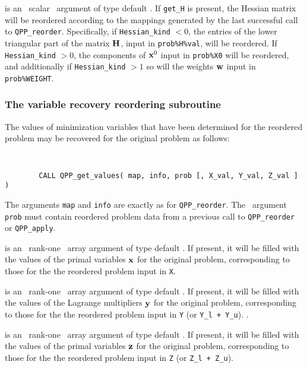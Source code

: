 \documentclass{galahad}
\newcommand{\packagename}{QPP}
\begin{document}
\begin{description}
is an \optional\ scalar \intentin\ argument of type default \logical. 
If {\tt get\_H} is present, the Hessian matrix will be reordered according to the
mappings generated by the last successful call to {\tt \packagename\_reorder}. 
Specifically, if {\tt Hessian\_kind} $< 0$, the entries of the 
lower triangular part of the matrix ${\mathbf{H}}$, input in {\tt prob\%H\%val}, 
will be reordered. If {\tt Hessian\_kind} $> 0$, the 
components of ${\mathbf{x}}^0$ input in {\tt prob\%X0} will be reordered, 
and additionally if {\tt Hessian\_kind} $> 1$ so will the weights 
${\mathbf{w}}$ input in {\tt prob\%WEIGHT}.

\end{description}


\subsubsection{The  variable recovery reordering subroutine}
The values of minimization variables that have been determined for the 
reordered problem may be recovered for the original problem as follows: 
\vspace*{-2mm}
{\tt 
\begin{verbatim}
        CALL QPP_get_values( map, info, prob [, X_val, Y_val, Z_val ] )
\end{verbatim}
}
\vspace*{-1mm}
\noindent
The arguments {\tt map} and {\tt info} are exactly as for 
{\tt \packagename\_reorder}. 
The \intentin\ argument {\tt prob}
must contain reordered problem data from a previous call 
to {\tt QPP\_reorder} or {\tt QPP\_apply}.

\begin{description}
 is an \optional\ rank-one \intentout\ array argument of 
type default \realdp. If 
present, it will be filled with the values of the primal variables ${\mathbf{x}}$ 
for the original problem, corresponding to those for the the reordered 
problem input in {\tt X}. 
 
 is an \optional\ rank-one \intentout\ array argument of 
type default \realdp. If present, 
it will be filled with the values of the Lagrange multipliers ${\mathbf{y}}$ 
for the original problem, corresponding to those for the the reordered 
problem input in {\tt Y} (or {\tt Y\_l + Y\_u}).
. 
 
 is an \optional\ rank-one \intentout\ array argument of 
type default \realdp. If 
present, it will be filled with the values of the primal variables ${\mathbf{z}}$ 
for the original problem, corresponding to those for the the reordered 
problem input in {\tt Z} (or {\tt Z\_l + Z\_u}).
\end{description}
\end{document}
